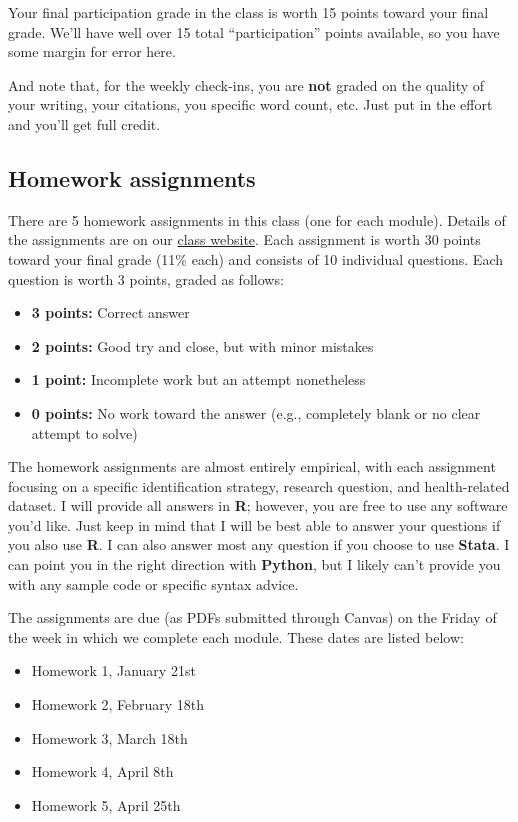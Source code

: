 \documentclass[11pt,]{article}
\providecommand{\tightlist}{%
  \setlength{\itemsep}{0pt}\setlength{\parskip}{0pt}}
\begin{document}
Your final participation grade in the class is worth 15 points toward
your final grade. We'll have well over 15 total ``participation'' points
available, so you have some margin for error here.

And note that, for the weekly check-ins, you are \textbf{not} graded on
the quality of your writing, your citations, you specific word count,
etc. Just put in the effort and you'll get full credit.

\hypertarget{homework-assignments}{%
\subsection{Homework assignments}\label{homework-assignments}}

There are 5 homework assignments in this class (one for each module).
Details of the assignments are on our
\href{https://econ470s22.classes.ianmccarthyecon.com/}{class website}.
Each assignment is worth 30 points toward your final grade (11\% each)
and consists of 10 individual questions. Each question is worth 3
points, graded as follows:

\begin{itemize}
\tightlist
\item
  \textbf{3 points:} Correct answer
\item
  \textbf{2 points:} Good try and close, but with minor mistakes
\item
  \textbf{1 point:} Incomplete work but an attempt nonetheless
\item
  \textbf{0 points:} No work toward the answer (e.g., completely blank
  or no clear attempt to solve)
\end{itemize}

The homework assignments are almost entirely empirical, with each
assignment focusing on a specific identification strategy, research
question, and health-related dataset. I will provide all answers in
\textbf{R}; however, you are free to use any software you'd like. Just
keep in mind that I will be best able to answer your questions if you
also use \textbf{R}. I can also answer most any question if you choose
to use \textbf{Stata}. I can point you in the right direction with
\textbf{Python}, but I likely can't provide you with any sample code or
specific syntax advice.

The assignments are due (as PDFs submitted through Canvas) on the Friday
of the week in which we complete each module. These dates are listed
below:

\begin{itemize}
\tightlist
\item
  Homework 1, January 21st
\item
  Homework 2, February 18th
\item
  Homework 3, March 18th
\item
  Homework 4, April 8th
\item
  Homework 5, April 25th
\end{itemize}
\end{document}
